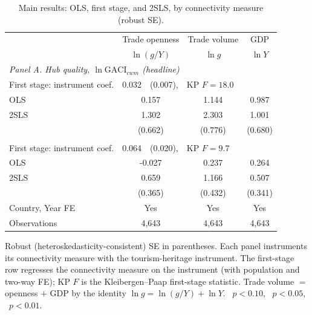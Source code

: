 \begin{table}[ht!]
\centering
\caption{Main results: OLS, first stage, and 2SLS, by connectivity measure (robust SE).}
\label{tab:main}
\begin{threeparttable}
\small
\begin{tabular}{lccc}
\toprule
 & Trade openness & Trade volume & GDP \\
 & $\ln(g/Y)$ & $\ln g$ & $\ln Y$ \\
\midrule
\multicolumn{4}{l}{\emph{Panel A. Hub quality, $\ln\mathrm{GACI}_{cwm}$ (headline)}}\\
First stage: instrument coef. & \multicolumn{3}{l}{0.032\sym{***}\ \ (0.007),\ \ KP $F=18.0$} \\
OLS & 0.157\sym{***} & 1.144\sym{***} & 0.987\sym{***} \\
2SLS & 1.302\sym{**} & 2.303\sym{***} & 1.001 \\
 & (0.662) & (0.776) & (0.680) \\
\addlinespace
\multicolumn{4}{l}{\emph{Panel B. Total connectivity, $\ln\mathrm{GACI}_{sum}$}}\\
First stage: instrument coef. & \multicolumn{3}{l}{0.064\sym{***}\ \ (0.020),\ \ KP $F=9.7$} \\
OLS & -0.027 & 0.237\sym{***} & 0.264\sym{***} \\
2SLS & 0.659\sym{*} & 1.166\sym{***} & 0.507 \\
 & (0.365) & (0.432) & (0.341) \\
\midrule
Country, Year FE & Yes & Yes & Yes \\
Observations & 4{,}643 & 4{,}643 & 4{,}643 \\
\bottomrule
\end{tabular}
\begin{tablenotes}\footnotesize
\item Robust (heteroskedasticity-consistent) SE in parentheses. Each panel
instruments its connectivity measure with the tourism-heritage instrument. The
first-stage row regresses the connectivity measure on the instrument (with
population and two-way FE); KP $F$ is the Kleibergen--Paap first-stage statistic.
Trade volume $=$ openness $+$ GDP by the identity $\ln g=\ln(g/Y)+\ln Y$.
\sym{*}~$p<0.10$, \sym{**}~$p<0.05$, \sym{***}~$p<0.01$.
\end{tablenotes}
\end{threeparttable}
\end{table}

